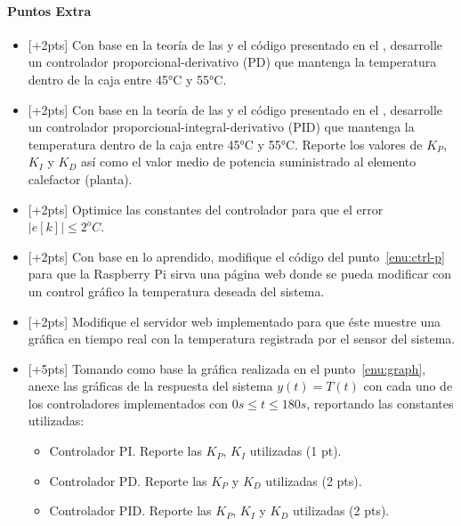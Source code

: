 \paragraph{Puntos Extra}
\begin{itemize}
	\item{} [+2pts] Con base en la teoría de las  y el código presentado en el , desarrolle un controlador proporcional-derivativo (PD) que mantenga la temperatura dentro de la caja entre 45°C y 55°C.

	\item{} [+2pts] Con base en la teoría de las  y el código presentado en el , desarrolle un controlador proporcional-integral-derivativo (PID) que mantenga la temperatura dentro de la caja entre 45°C y 55°C.
	Reporte los valores de $K_P$, $K_I$ y $K_D$ así como el valor medio de potencia suministrado al elemento calefactor (planta).

	\item{} [+2pts] Optimice las constantes del controlador para que el error $\big\lvert e[k]\big\rvert \leq 2^{o}C$.

	\item{} [+2pts] Con base en lo aprendido, modifique el código del punto~\ref{enu:ctrl-p} para que la Raspberry Pi sirva una página web donde se pueda modificar con un control gráfico la temperatura deseada del sistema.

	\item{} [+2pts] Modifique el servidor web implementado para que éste muestre una gráfica en tiempo real con la temperatura registrada por el sensor del sistema.

	\item{} [+5pts] Tomando como base la gráfica realizada en el punto~\ref{enu:graph}, anexe las gráficas de la respuesta del sistema $y(t) = T(t)$ con cada uno de los controladores implementados con $0s \leq t \leq 180s$, reportando las constantes utilizadas:
	\begin{itemize}[nosep]
		\item Controlador PI. Reporte las $K_P$, $K_I$ utilizadas (1 pt).
		\item Controlador PD. Reporte las $K_P$ y $K_D$ utilizadas (2 pts).
		\item Controlador PID. Reporte las $K_P$, $K_I$ y $K_D$ utilizadas (2 pts).
	\end{itemize}
\end{itemize}

